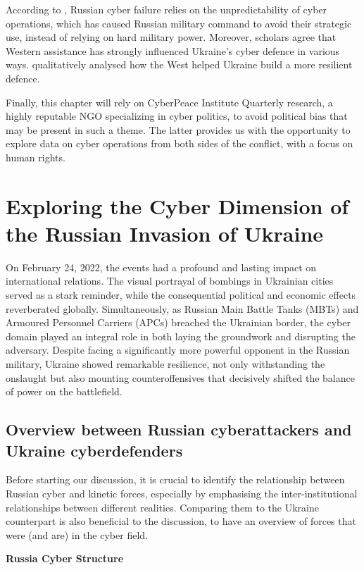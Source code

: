 According to \textcite{lin_2022_russian}, Russian cyber failure relies on the unpredictability of cyber operations, which has caused Russian military command to avoid their strategic use, instead of relying on hard military power. Moreover, scholars agree that Western assistance has strongly influenced Ukraine's cyber defence in various ways. \textcite{beecroft_2022_evaluating} qualitatively analysed how the West helped Ukraine build a more resilient defence.

Finally, this chapter will rely on CyberPeace Institute Quarterly research, a highly reputable NGO specializing in cyber politics, to avoid political bias that may be present in such a theme. The latter provides us with the opportunity to explore data on cyber operations from both sides of the conflict, with a focus on human rights.

\section{Exploring the Cyber Dimension of the Russian Invasion of Ukraine}

On February 24, 2022, the events had a profound and lasting impact on international relations. The visual portrayal of bombings in Ukrainian cities served as a stark reminder, while the consequential political and economic effects reverberated globally. Simultaneously, as Russian Main Battle Tanks (MBTs) and Armoured Personnel Carriers (APCs) breached the Ukrainian border, the cyber domain played an integral role in both laying the groundwork and disrupting the adversary. Despite facing a significantly more powerful opponent in the Russian military, Ukraine showed remarkable resilience, not only withstanding the onslaught but also mounting counteroffensives that decisively shifted the balance of power on the battlefield.

\subsection{Overview between Russian cyberattackers and Ukraine cyberdefenders}
Before starting our discussion, it is crucial to identify the relationship between Russian cyber and kinetic forces, especially by emphasising the inter-institutional relationships between different realities. Comparing them to the Ukraine counterpart is also beneficial to the discussion, to have an overview of forces that were (and are) in the cyber field.  

\textbf{Russia Cyber Structure}

